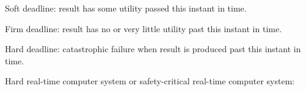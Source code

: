 Soft deadline: result has some utility passed this instant in time.

Firm deadline: result has no or very little utility past this instant in
time.

Hard deadline: catastrophic failure when result is produced past this
instant in time.

Hard real-time computer system or safety-critical real-time computer
system:




%
%
%
%
%
%
%
%
%
%
%
%
